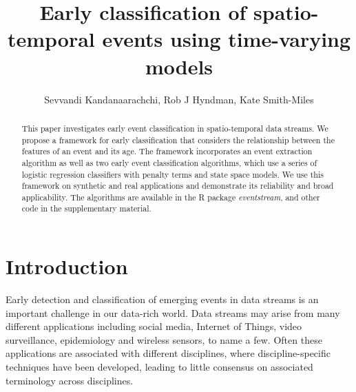 \documentclass[a4paper,11pt]{article}
\begin{document}

\title{Early classification of spatio-temporal events using time-varying models}
\author{Sevvandi Kandanaarachchi, Rob J Hyndman, Kate Smith-Miles}
\maketitle

\begin{abstract}
This paper investigates early event classification in spatio-temporal data streams. We propose a framework for early classification that considers the relationship between the features of an event and its age. The framework incorporates an event extraction algorithm as well as two early event classification algorithms, which use a series of logistic regression classifiers with penalty terms and state space models. We use this framework on synthetic and real applications and demonstrate its reliability and broad applicability. The algorithms are available in the R package \textit{eventstream}, and other code in the supplementary material.
\end{abstract}



\section{Introduction}

Early detection and classification of emerging events in data streams is an important challenge in our data-rich world. Data streams may arise from many different applications including social media, Internet of Things, video surveillance, epidemiology and wireless sensors, to name a few. Often these applications are associated with different disciplines, where discipline-specific techniques have been developed, leading to little consensus on associated terminology across disciplines.
\end{document}
